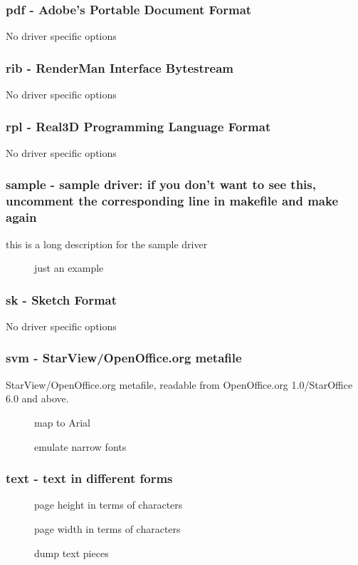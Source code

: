 \documentclass[english,a4paper]{article}
\begin{document}
\subsubsection{pdf - Adobe's Portable Document Format}
No driver specific options
\subsubsection{rib - RenderMan Interface Bytestream}
No driver specific options
\subsubsection{rpl - Real3D Programming Language Format}
No driver specific options
\subsubsection{sample - sample driver: if you don't want to see this, uncomment the corresponding line in makefile and make again}
this is a long description for the sample driver

\begin{description}
\item[] 
just an example


\end{description}
\subsubsection{sk - Sketch Format}
No driver specific options
\subsubsection{svm - StarView/OpenOffice.org metafile}
StarView/OpenOffice.org metafile, readable from OpenOffice.org 1.0/StarOffice 6.0 and above.

\begin{description}
\item[] 
map to Arial


\item[] 
emulate narrow fonts


\end{description}
\subsubsection{text - text in different forms }
\begin{description}
\item[] 
page height in terms of characters


\item[] 
page width in terms of characters


\item[] 
dump text pieces


\end{description}
\end{document}
